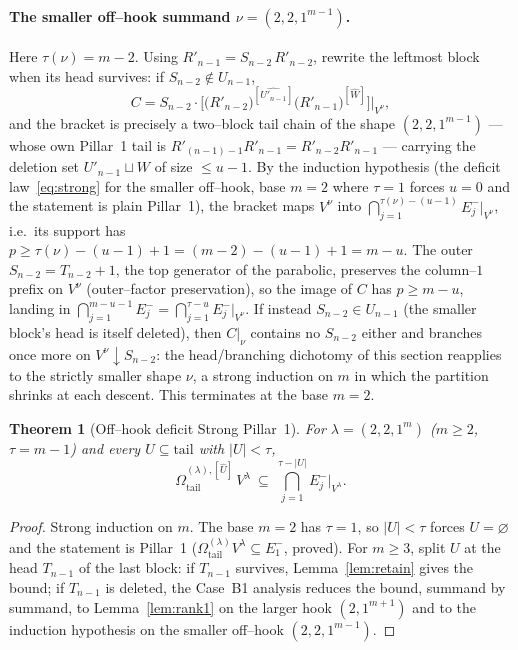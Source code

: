 \documentclass[11pt]{article}
\newtheorem{theorem}{Theorem}
\theoremstyle{definition}
\newcommand{\Vlam}{V^\lambda}
\newcommand{\Vnu}{V^\nu}
\newcommand{\Rp}{{R'}}
\newcommand{\Em}[1]{E^{-}_{#1}}
\newcommand{\Om}{\Omega^{(\lambda)}_{\mathrm{tail}}}
\newcommand{\OmU}{\Omega^{(\lambda),[\widehat U]}_{\mathrm{tail}}}
\begin{document}
\paragraph{The smaller off--hook summand $\nu=(2,2,1^{m-1})$.} Here $\tau(\nu)=m-2$.
Using $\Rp_{n-1}=S_{n-2}\,\Rp_{n-2}$, rewrite the leftmost block when its head survives:
if $S_{n-2}\notin U_{n-1}$,
\[
   C=S_{n-2}\cdot\Big[\big(\Rp_{n-2}\big)^{[\widehat{U'_{n-1}}]}\big(\Rp_{n-1}\big)^{[\widehat W]}\Big]
   \Big|_{\Vnu},
\]
and the bracket is precisely a two--block tail chain of the shape $(2,2,1^{m-1})$ --- whose
own Pillar~1 tail is $\Rp_{(n-1)-1}\Rp_{n-1}=\Rp_{n-2}\Rp_{n-1}$ --- carrying the deletion
set $U'_{n-1}\sqcup W$ of size $\le u-1$. By the induction hypothesis (the deficit
law~\eqref{eq:strong} for the smaller off--hook, base $m=2$ where $\tau=1$ forces $u=0$ and
the statement is plain Pillar~1), the bracket maps $\Vnu$ into
$\bigcap_{j=1}^{\tau(\nu)-(u-1)}\Em j|_{\Vnu}$, i.e.\ its support has
$p\ge\tau(\nu)-(u-1)+1=(m-2)-(u-1)+1=m-u$. The outer $S_{n-2}=T_{n-2}+1$, the top generator
of the parabolic, preserves the column--$1$ prefix on $\Vnu$ (outer--factor preservation),
so the image of $C$ has $p\ge m-u$, landing in $\bigcap_{j=1}^{m-u-1}\Em j=
\bigcap_{j=1}^{\tau-u}\Em j|_{\Vnu}$. If instead $S_{n-2}\in U_{n-1}$ (the smaller block's
head is itself deleted), then $C|_\nu$ contains no $S_{n-2}$ either and branches once more on
$V^\nu\!\downarrow\!S_{n-2}$: the head/branching dichotomy of this section reapplies to the
strictly smaller shape $\nu$, a strong induction on $m$ in which the partition shrinks at each
descent. This terminates at the base $m=2$.

\begin{theorem}[Off--hook deficit Strong Pillar~1]\label{thm:offhook}
For $\lambda=(2,2,1^m)$ ($m\ge2$, $\tau=m-1$) and every $U\subseteq\mathrm{tail}$ with
$|U|<\tau$,
\[
   \OmU{}\,\Vlam\ \subseteq\ \bigcap_{j=1}^{\tau-|U|}\Em j\big|_{\Vlam}.
\]
\end{theorem}

\begin{proof}
Strong induction on $m$. The base $m=2$ has $\tau=1$, so $|U|<\tau$ forces $U=\varnothing$
and the statement is Pillar~1 ($\Om\Vlam\subseteq\Em1$, proved). For $m\ge3$, split $U$ at
the head $T_{n-1}$ of the last block: if $T_{n-1}$ survives, Lemma~\ref{lem:retain} gives the
bound; if $T_{n-1}$ is deleted, the Case~B1 analysis reduces the bound, summand by summand,
to Lemma~\ref{lem:rank1} on the larger hook $(2,1^{m+1})$ and to the induction hypothesis on
the smaller off--hook $(2,2,1^{m-1})$.
\end{proof}
\end{document}
